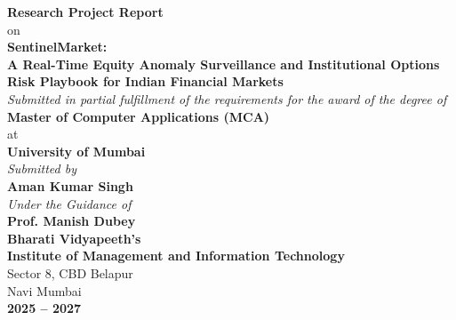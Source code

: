 \begin{titlepage}
\begin{center}

\vspace*{0.5cm}

{\Large \textbf{Research Project Report}}\\[0.4cm]
{\large on}\\[0.5cm]

{\LARGE \textbf{SentinelMarket:}}\\[0.3cm]
{\Large \textbf{A Real-Time Equity Anomaly Surveillance and Institutional Options Risk Playbook for Indian Financial Markets}}\\[1.2cm]

{\normalsize \textit{Submitted in partial fulfillment of the requirements for the award of the degree of}}\\[0.3cm]
{\Large \textbf{Master of Computer Applications (MCA)}}\\[0.3cm]
{\normalsize at}\\[0.2cm]
{\Large \textbf{University of Mumbai}}\\[1.2cm]

{\normalsize \textit{Submitted by}}\\[0.2cm]
{\Large \textbf{Aman Kumar Singh}}\\[1.2cm]

{\normalsize \textit{Under the Guidance of}}\\[0.2cm]
{\Large \textbf{Prof. Manish Dubey}}\\[1.5cm]

{\large \textbf{Bharati Vidyapeeth's}}\\[0.15cm]
{\large \textbf{Institute of Management and Information Technology}}\\[0.15cm]
{\normalsize Sector 8, CBD Belapur}\\[0.1cm]
{\normalsize Navi Mumbai}\\[0.6cm]
{\large \textbf{2025 -- 2027}}

\end{center}
\end{titlepage}
\newpage
